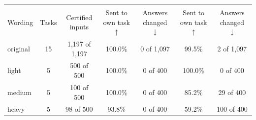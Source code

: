 \begin{tabular}{lcccccc}
    \toprule
    & & \multicolumn{3}{c}{\cert{}} & \multicolumn{2}{c}{\centre{}} \\
    \cmidrule(lr){3-5} \cmidrule(lr){6-7}
    Wording & Tasks & Certified inputs & \shortstack[c]{Sent to own\\task $\uparrow$} & \shortstack[c]{Answers\\changed $\downarrow$} & \shortstack[c]{Sent to own\\task $\uparrow$} & \shortstack[c]{Answers\\changed $\downarrow$} \\
    \midrule
    original & 15 & 1{,}197 of 1{,}197 & 100.0\% & 0 of 1{,}097 & 99.5\% & 2 of 1{,}097 \\
    light & 5 & 500 of 500 & 100.0\% & 0 of 400 & 100.0\% & 0 of 400 \\
    medium & 5 & 100 of 500 & 100.0\% & 0 of 400 & 85.2\% & 29 of 400 \\
    heavy & 5 & 98 of 500 & 93.8\% & 0 of 400 & 59.2\% & 100 of 400 \\
    \bottomrule
\end{tabular}
